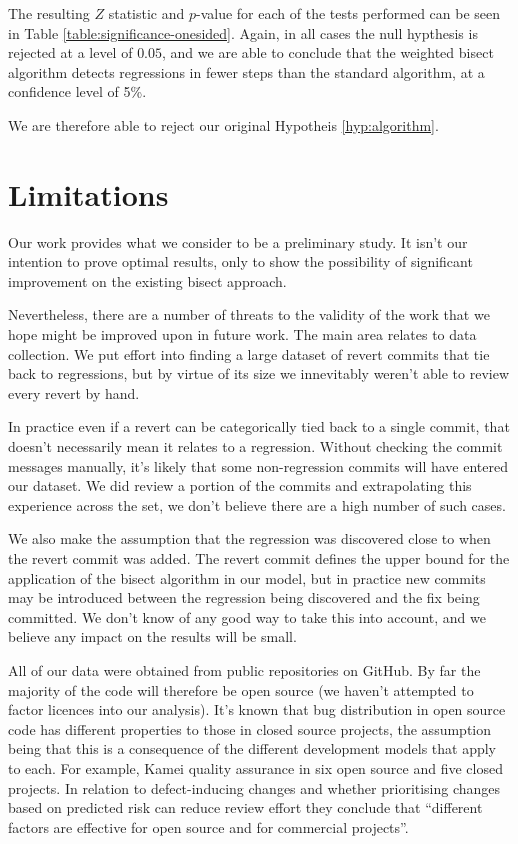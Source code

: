 \documentclass[10pt,journal,compsoc]{IEEEtran}
\begin{document}
The resulting $Z$ statistic and $p$-value for each of the tests performed can be seen in Table \ref{table:significance-onesided}. Again, in all cases the null hypthesis is rejected at a level of $0.05$, and we are able to conclude that the weighted bisect algorithm detects regressions in fewer steps than the standard algorithm, at a confidence level of 5\%.

We are therefore able to reject our original Hypotheis \ref{hyp:algorithm}.

\section{Limitations}
\label{section:limitations}

Our work provides what we consider to be a preliminary study. It isn't our intention to prove optimal results, only to show the possibility of significant improvement on the existing bisect approach.

Nevertheless, there are a number of threats to the validity of the work that we hope might be improved upon in future work. The main area relates to data collection. We put effort into finding a large dataset of revert commits that tie back to regressions, but by virtue of its size we innevitably weren't able to review every revert by hand.

In practice even if a revert can be categorically tied back to a single commit, that doesn't necessarily mean it relates to a regression. Without checking the commit messages manually, it's likely that some non-regression commits will have entered our dataset. We did review a portion of the commits and extrapolating this experience across the set, we don't believe there are a high number of such cases.

We also make the assumption that the regression was discovered close to when the revert commit was added. The revert commit defines the upper bound for the application of the bisect algorithm in our model, but in practice new commits may be introduced between the regression being discovered and the fix being committed. We don't know of any good way to take this into account, and we believe any impact on the results will be small.

All of our data were obtained from public repositories on GitHub. By far the majority of the code will therefore be open source (we haven't attempted to factor licences into our analysis). It's known that bug distribution in open source code has different properties to those in closed source projects, the assumption being that this is a consequence of the different development models that apply to each. For example, Kamei \etal \cite{kamei2013} quality assurance in six open source and five closed projects. In relation to defect-inducing changes and whether prioritising changes based on predicted risk can reduce review effort they conclude that ``different factors are effective for open source and for commercial projects''.
\end{document}
